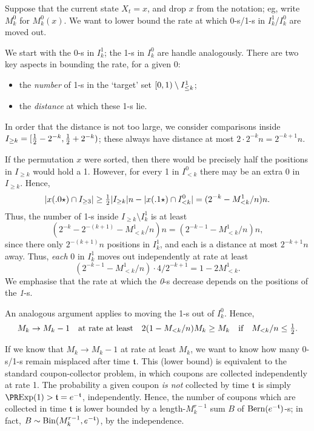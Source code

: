 \documentclass{article}
\begin{document}
\begin{Proof}
Suppose that the current state $X_t = x$, and drop $x$ from the notation; eg, write $M_k^0$ for $M_k^0(x)$.
We want to lower bound the rate at which 0-s/1-s in $I_k^1$/$I_k^0$ are moved out.

We start with the 0-s in $I_k^1$; the 1-s in $I_k^0$ are handle analogously.
There are two key aspects in bounding the rate, for a given 0:
\begin{itemize}[noitemsep]
	\item 
	the \emph{number} of 1-s in the `target' set $[0, 1) \setminus I_{\le k}^1$;
	
	\item 
	the \emph{distance} at which these 1-s lie.
\end{itemize}
In order that the distance is not too large, we consider comparisons inside $I_{\ge k} = [ \tfrac12 - 2^{-k}, \tfrac12 + 2^{-k} )$; these always have distance at most $2 \cdot 2^{-k} n = 2^{-k+1} n$.

If the permutation $x$ were sorted, then there would be precisely half the positions in $I_{\ge k}$ would hold a 1.
However, for every 1 in $I_{< k}^0$ there may be an extra 0 in $I_{\ge k}$.
Hence,
\[
	|  x(.0\star) \cap I_{\ge 3}  |
\ge
	\tfrac12
	|  I_{\ge k}  |
	n
-	|  x(.1\star) \cap I_{< k}^0  |
=
	(2^{-k} - M_{< k}^1/n) n.
\]
Thus, the number of 1-s inside $I_{\ge k} \setminus I_k^1$ is at least
\[
	(2^{-k} - 2^{-(k+1)} - M_{< k}^1/n) n
=
	(2^{-k-1} - M_{< k}^1/n) n,
\]
since there only $2^{-(k+1)} n$ positions in $I_k^1$, and each is a distance at most $2^{-k+1} n$ away.
Thus, \emph{each} 0 in $I_k^1$ moves out independently at rate at least
\[
	(2^{-k-1} - M_{< k}^1/n) \cdot 4 / 2^{-k+1}
=
	1 - 2 M_{< k}^1.
\]
We emphasise that the rate at which the \emph{0}-s decrease depends on the positions of the \emph{1}-s.

An analogous argument applies to moving the 1-s out of $I_k^0$.
Hence,
\[
	M_k \to M_k - 1
\Quad{at rate at least}
	2 (1 - M_{< k}/n) M_k
\ge
	M_k
\Qif
	M_{< k}/n
\le
	\tfrac12.
\]

If we know that $M_k \to M_k - 1$ at rate at least $M_k$, we want to know how many 0-s/1-s remain misplaced after time $\mathfrak{t}$.
This (lower bound) is equivalent to the standard coupon-collector problem, in which coupons are collected independently at rate 1.
The probability a given coupon \emph{is not} collected by time $\mathfrak{t}$ is simply $\pr{ \Exp(1) > \mft } = e^{-\mft}$, independently.
Hence, the number of coupons which are collected in time $\mathfrak{t}$ is lower bounded by a length-$M_k^{r-1}$ sum $B$ of $\operatorname{Bern}(e^{-\mathfrak{t}})$-s; in fact, $B \sim \operatorname{Bin}(M_k^{r-1}, e^{-\mathfrak{t}})$, by the independence.


\end{Proof}
\end{document}
